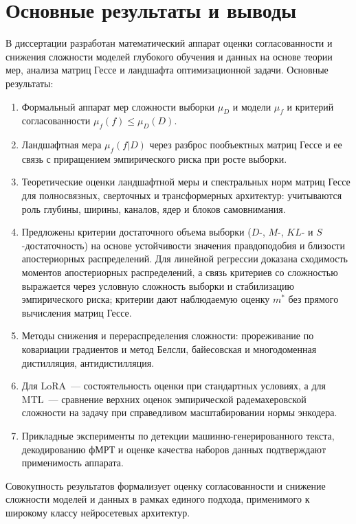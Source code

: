 \documentclass{dissert}
\begin{document}
\section*{Основные результаты и выводы}
В диссертации разработан математический аппарат оценки согласованности и снижения сложности моделей глубокого обучения и данных на основе теории мер, анализа матриц Гессе и ландшафта оптимизационной задачи.
Основные результаты:
\begin{enumerate}
    \item Формальный аппарат мер сложности выборки $\mu_D$ и модели $\mu_f$ и критерий согласованности $\mu_f(f)\le\mu_D(D)$.
    \item Ландшафтная мера $\mu_f(f|D)$ через разброс пообъектных матриц Гессе и ее связь с приращением эмпирического риска при росте выборки.
    \item Теоретические оценки ландшафтной меры и спектральных норм матриц Гессе для полносвязных, сверточных и трансформерных архитектур: учитываются роль глубины, ширины, каналов, ядер и блоков самовнимания.
    \item Предложены критерии достаточного объема выборки ($D$-, $M$-, $KL$- и $S$-достаточность) на основе устойчивости значения правдоподобия и близости апостериорных распределений. Для линейной регрессии доказана сходимость моментов апостериорных распределений, а связь критериев со сложностью выражается через условную сложность выборки и стабилизацию эмпирического риска; критерии дают наблюдаемую оценку $m^*$ без прямого вычисления матриц Гессе.
    \item Методы снижения и перераспределения сложности: прореживание по ковариации градиентов и метод Белсли, байесовская и многодоменная дистилляция, антидистилляция.
    \item Для LoRA~--- состоятельность оценки при стандартных условиях, а для MTL~--- сравнение верхних оценок эмпирической радемахеровской сложности на задачу при справедливом масштабировании нормы энкодера.
    \item Прикладные эксперименты по детекции машинно-генерированного текста, декодированию фМРТ и оценке качества наборов данных подтверждают применимость аппарата.
\end{enumerate}
Совокупность результатов формализует оценку согласованности и снижение сложности моделей и данных в рамках единого подхода, применимого к широкому классу нейросетевых архитектур.
\end{document}
